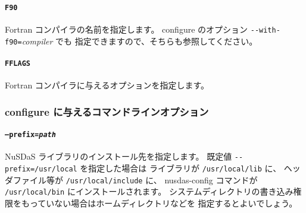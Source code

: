 \paragraph{\tt F90}
Fortran コンパイラの名前を指定します。
configure のオプション \verb|--with-f90=|{\it compiler} でも
指定できますので、そちらも参照してください。

\paragraph{\tt FFLAGS}
Fortran コンパイラに与えるオプションを指定します。

\subsubsection{configure に与えるコマンドラインオプション}

\paragraph{\tt --prefix=\it path}

NuSDaS ライブラリのインストール先を指定します。
既定値 \verb|--prefix=/usr/local| を指定した場合は
ライブラリが \verb|/usr/local/lib| に、
ヘッダファイル等が \verb|/usr/local/include| に、
nusdas-config コマンドが \verb|/usr/local/bin| にインストールされます。
システムディレクトリの書き込み権限をもっていない場合はホームディレクトリなどを
指定するとよいでしょう。

